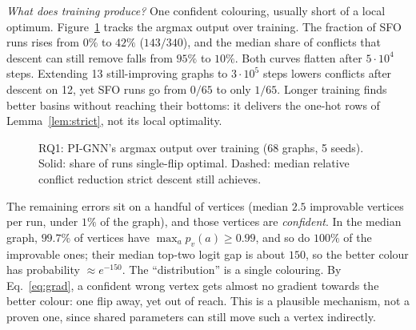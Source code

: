 \documentclass[11pt]{article}
\begin{document}
\emph{What does training produce?} One confident colouring, usually short of a
local optimum. Figure~\ref{fig:rq1} tracks the argmax output over training.
The fraction of SFO runs rises from $0\%$ to $42\%$ ($143/340$), and the
median share of conflicts that descent can still remove falls from $95\%$ to
$10\%$. Both curves flatten after $5{\cdot}10^4$ steps. Extending 13
still-improving graphs to $3{\cdot}10^5$ steps lowers conflicts after descent
on 12, yet SFO runs go from $0/65$ to only $1/65$. Longer training finds
better basins without reaching their bottoms: it delivers the one-hot rows of
Lemma~\ref{lem:strict}, not its local optimality.

\begin{figure}[t]
\centering
{}
\caption{RQ1: PI-GNN's argmax output over training (68 graphs, 5 seeds).
Solid: share of runs single-flip optimal. Dashed: median relative conflict
reduction strict descent still achieves.}
\label{fig:rq1}
\end{figure}

The remaining errors sit on a handful of vertices (median $2.5$ improvable
vertices per run, under $1\%$ of the graph), and those vertices are
\emph{confident}. In the median graph, $99.7\%$ of vertices have
$\max_a p_v(a)\ge 0.99$, and so do $100\%$ of the improvable ones; their median
top-two logit gap is about $150$, so the better colour has probability
$\approx e^{-150}$. The ``distribution'' is a single colouring. By
Eq.~\eqref{eq:grad}, a confident
wrong vertex gets almost no gradient towards the better colour: one flip away,
yet out of reach. This is a plausible mechanism, not a proven one, since shared
parameters can still move such a vertex indirectly.
\end{document}
